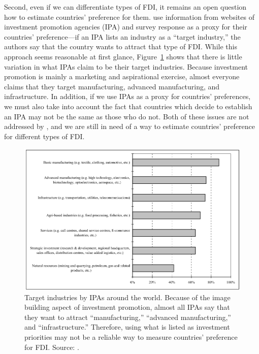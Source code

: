 Second, even if we can differentiate types of FDI, it remains an open question
how to estimate countries' preference for them. \citet{Alfaro2007} use
information from websites of investment promotion agencies (IPA) and survey
response as a proxy for their countries' preference---if an IPA lists an
industry as a ``target industry,'' the authors say that the country wants to
attract that type of FDI. While this approach seems reasonable at first glance,
Figure~\ref{fig:IPA_target_industries} shows that there is little variation in
what IPAs claim to be their target industries. Because investment promotion is
mainly a marketing and aspirational exercise, almost everyone claims that they
target manufacturing, advanced manufacturing, and infrastructure. In addition,
if we use IPAs as a proxy for countries' preferences, we must also take into
account the fact that countries which decide to establish an IPA may not be the
same as those who do not. Both of these issues are not addressed by
\citet{Alfaro2007}, and we are still in need of a way to estimate countries'
preference for different types of FDI.

\begin{figure}[tbp] \centering
  \includegraphics[width=\textwidth,keepaspectratio]{../figure/IPA_target_industries}
  \caption[Target industries by IPAs around the world.]{Target industries by
    IPAs around the world. Because of the image building aspect of investment
    promotion, almost all IPAs say that they want to attract ``manufacturing,''
    ``advanced manufacturing,'' and ``infrastructure.'' Therefore, using what is
    listed as investment priorities may not be a reliable way to measure
    countries' preference for FDI. Source: \citet{UNCTAD2001}.}
  \label{fig:IPA_target_industries}
\end{figure}

